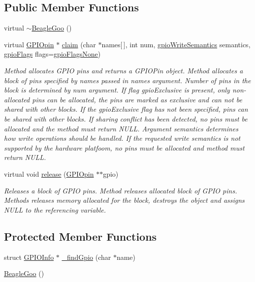 \subsection*{Public Member Functions}
\begin{DoxyCompactItemize}
\item 
virtual \hyperlink{struct_beagle_goo_a19514c99eb2f17004ad19ffb2cd0b1d5}{$\sim$\-Beagle\-Goo} ()
\item 
virtual \hyperlink{class_g_p_i_opin}{G\-P\-I\-Opin} $\ast$ \hyperlink{struct_beagle_goo_aa5aa13bba2ba0bc364202c7856410463}{claim} (char $\ast$names\mbox{[}$\,$\mbox{]}, int num, \hyperlink{class_g_p_i_ooo_ad4b133662b68989435bcd422feb0fc03}{gpio\-Write\-Semantics} semantics, \hyperlink{class_g_p_i_ooo_a63b72558d40ed7f3ccc0c6f11d1e3b10}{gpio\-Flags} flags=\hyperlink{class_g_p_i_ooo_a63b72558d40ed7f3ccc0c6f11d1e3b10aa64ecca268265aa77389ee957e01fd63}{gpio\-Flags\-None})
\begin{DoxyCompactList}\small\item\em Method allocates G\-P\-I\-O pins and returns a G\-P\-I\-O\-Pin object. Method allocates a block of pins specified by names passed in {\itshape names} argument. Number of pins in the block is determined by {\itshape num} argument. If flag {\itshape gpio\-Exclusive} is present, only non-\/allocated pins can be allocated, the pins are marked as exclusive and can not be shared with other blocks. If the {\itshape gpio\-Exclusive} flag has not been specified, pins can be shared with other blocks. If sharing conflict has been detected, no pins must be allocated and the method must return N\-U\-L\-L. Argument {\itshape semantics} determines how write operations should be handled. If the requested write semantics is not supported by the hardware platfoom, no pins must be allocated and method must return N\-U\-L\-L. \end{DoxyCompactList}\item 
virtual void \hyperlink{struct_beagle_goo_a67436fe547740cf9ff11f5942175b2fc}{release} (\hyperlink{class_g_p_i_opin}{G\-P\-I\-Opin} $\ast$$\ast$gpio)
\begin{DoxyCompactList}\small\item\em Releases a block of G\-P\-I\-O pins. Method releases allocated block of G\-P\-I\-O pins. Methods releases memory allocated for the block, destroys the object and assigns N\-U\-L\-L to the referencing variable. \end{DoxyCompactList}\end{DoxyCompactItemize}
\subsection*{Protected Member Functions}
\begin{DoxyCompactItemize}
\item 
struct \hyperlink{struct_beagle_goo_1_1_g_p_i_o_info}{G\-P\-I\-O\-Info} $\ast$ \hyperlink{struct_beagle_goo_a2870e374462486c977ed462d169bbc07}{\-\_\-find\-Gpio} (char $\ast$name)
\item 
\hyperlink{struct_beagle_goo_a06b2b0e2d3b22016edb11b515fad8f0a}{Beagle\-Goo} ()
\end{DoxyCompactItemize}
